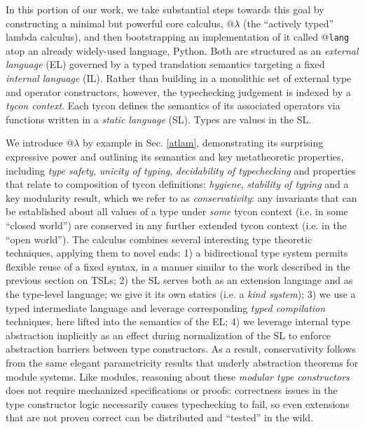 In this portion of our work, we take substantial steps towards this goal by  constructing a minimal but powerful core calculus, @$\lambda$ (the ``actively typed'' lambda calculus), and then bootstrapping an implementation of it called @\texttt{lang} atop an already widely-used language, Python. %
Both are structured as an \emph{external language} (EL) governed by a {typed translation semantics} targeting a fixed \emph{internal language} (IL). 
Rather than building in a monolithic set of external type and operator constructors, however, the typechecking judgement is indexed by a \emph{tycon context}. Each tycon defines the semantics of its associated operators via functions written in a \emph{static language} (SL). Types are values in the SL.%

We introduce @$\lambda$ by example in Sec. \ref{atlam}, demonstrating its surprising expressive power and outlining its semantics and key metatheoretic properties, including \emph{type safety}, \emph{unicity of typing},  \emph{decidability of typechecking} and properties that relate to composition of tycon definitions: \emph{hygiene}, \emph{stability of typing} and a key modularity result, which we refer to as  \emph{conservativity}: any invariants that can be established about all values of a type under \emph{some} tycon context (i.e. in some  ``closed world'') are conserved in any further extended tycon context (i.e. in the ``open world''). The calculus combines several interesting type theoretic techniques, applying them to novel ends: 1)  a bidirectional type system permits flexible reuse of a fixed syntax, in a manner similar to the work described in the previous section on TSLs; 2) the SL serves both as an extension language and as the type-level language; we give it its own statics (i.e. a \emph{kind system}); 3) we use a typed intermediate language and leverage corresponding \emph{typed compilation} techniques, here lifted into the semantics of the EL; 4) we leverage internal type abstraction implicitly as an effect during normalization of the SL to enforce abstraction barriers between type constructors. 
As a result, conservativity follows from the same elegant parametricity results that underly  abstraction theorems for module systems. 
Like modules, reasoning about these \emph{modular type constructors} does not require  mechanized specifications or proofs: correctness issues in the type constructor logic necessarily causes typechecking to fail, so even extensions that are not proven correct can be distributed and ``tested'' in the wild.


